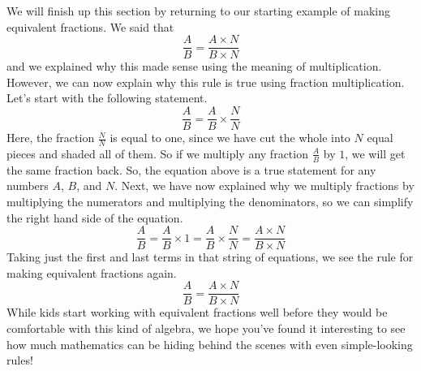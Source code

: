 \documentclass{ximera}
\begin{document}
We will finish up this section by returning to our starting example of making equivalent fractions. We said that 
\[
\frac{A}{B} = \frac{A \times N}{B \times N}
\]
and we explained why this made sense using the meaning of multiplication. However, we can now explain why this rule is true using fraction multiplication. Let's start with the following statement.
\[
\frac{A}{B} = \frac{A}{B} \times \frac{N}{N}
\]
Here, the fraction $\frac{N}{N}$ is equal to one, since we have cut the whole into $N$ equal pieces and shaded all of them. So if we multiply any fraction $\frac{A}{B}$ by $1$, we will get the same fraction back.  So, the equation above is a true statement for any numbers $A$, $B$, and $N$. Next, we have now explained why we multiply fractions by multiplying the numerators and multiplying the denominators, so we can simplify the right hand side of the equation.
\[
\frac{A}{B} = \frac{A}{B} \times 1 = \frac{A}{B} \times \frac{N}{N} = \frac{A \times N}{B \times N}
\]
Taking just the first and last terms in that string of equations, we see the rule for making equivalent fractions again.
\[
\frac{A}{B} = \frac{A \times N}{B \times N}
\]
While kids start working with equivalent fractions well before they would be comfortable with this kind of algebra, we hope you've found it interesting to see how much mathematics can be hiding behind the scenes with even simple-looking rules!
\end{document}
